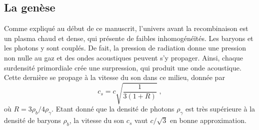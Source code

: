 \subsection{La genèse}
Comme expliqué au début de ce manuscrit, l'univers avant la recombinaison est un plasma chaud et dense, qui présente de faibles inhomogénéïtés.
Les baryons et les photons y sont couplés. De fait, la pression de radiation donne une pression non nulle au gaz et des ondes acoustiques peuvent s'y propager. Ainsi, chaque surdensité primordiale crée une surpression, qui produit une onde acoustique. Cette dernière se propage à la vitesse du son dans ce milieu, donnée par
\begin{equation}
  \label{eq:sound_speed}
  c_{s} = c \sqrt{\frac{1}{3(1 + R)}} \; ,
\end{equation}
où $R = 3\rho_b / 4\rho_{\gamma}$. Etant donné que la densité de photons $\rho_{\gamma}$ est très supérieure à la densité de baryons $\rho_{b}$, la vitesse du son $c_s$ vaut $c/\sqrt{3}$ en bonne approximation.
